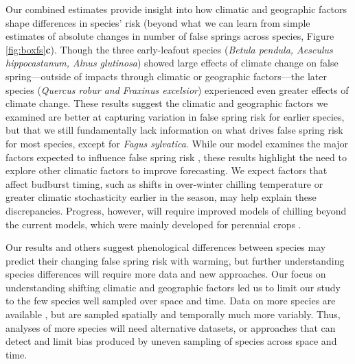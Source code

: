 \documentclass{article}\usepackage[]{graphicx}\usepackage[]{color}
\begin{document}
Our combined estimates provide insight into how climatic and geographic factors shape differences in species' risk (beyond what we can learn from simple estimates of absolute changes in number of false springs across species, Figure \ref{fig:boxfs}\textbf{c}).  Though the three early-leafout species (\textit{Betula pendula, Aesculus hippocastanum, Alnus glutinosa}) showed large effects of climate change on false spring---outside of impacts through climatic or geographic factors---the later species (\textit{Quercus robur and Fraxinus excelsior}) experienced even greater effects of climate change. These results suggest the climatic and geographic factors we examined are better at capturing variation in false spring risk for earlier species, but that we still fundamentally lack information on what drives false spring risk for most species, except for \textit{Fagus sylvatica}. While our model examines the major factors expected to influence false spring risk \citep{Wypych2016a,Liu2018,Ma2018,Vitasse2018}, these results highlight the need to explore other climatic factors to improve forecasting. We expect factors that affect budburst timing, such as shifts in over-winter chilling temperature or greater climatic stochasticity earlier in the season, may help explain these discrepancies. Progress, however, will require improved models of chilling beyond the current models, which were mainly developed for perennial crops \citep{Dennis2003,Luedeling2011}. 

Our results and others \citep{Ma2018} suggest phenological differences between species may predict their changing false spring risk with warming, but further understanding species differences will require more data and new approaches. Our focus on understanding shifting climatic and geographic factors led us to limit our study to the few species well sampled over space and time. Data on more species are available \citep[e.g., ][]{Ma2018}, but are sampled spatially and temporally much more variably. Thus, analyses of more species will need alternative datasets, or approaches that can detect and limit bias produced by uneven sampling of species across space and time.
\end{document}
